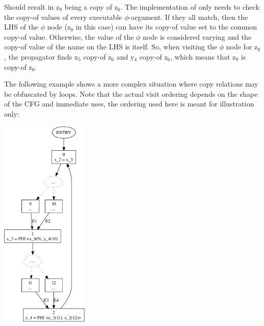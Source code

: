 Should result in z$_9$ being a copy of z$_6$.  The implementation
of  only needs to check the copy-of
values of every executable $\phi$-argument.  If they all match,
then the LHS of the $\phi$ node (z$_9$ in this case) can have its
copy-of value set to the common copy-of value.  Otherwise, the
value of the $\phi$ node is considered varying and the copy-of
value of the name on the LHS is itself.  So, when visiting the
$\phi$ node for z$_9$, the propagator finds x$_5$ copy-of z$_6$
and y$_4$ copy-of z$_6$, which means that z$_9$ is copy-of z$_6$.

The following example shows a more complex situation where copy
relations may be obfuscated by loops.  Note that the actual visit
ordering depends on the shape of the CFG and immediate uses, the
ordering used here is meant for illustration only:

\begin{center}
\parbox{2in}{\includegraphics[height=4in]{copy-prop-3}}
\end{center}

